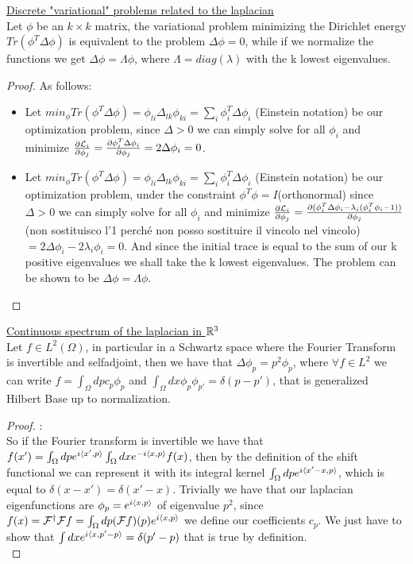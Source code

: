 \documentclass[../main.tex]{subfiles}
\begin{document}
\begin{prop}
    \underline{Discrete "variational" problems related to the laplacian}\\
    Let $\phi$ be an $k \times k$ matrix, the variational problem minimizing the Dirichlet energy $Tr(\phi^T \Delta \phi)$ is equivalent to
    the problem $\Delta \phi = 0$, while if we normalize the functions we get $\Delta \phi = \Lambda \phi$, where $\Lambda = diag(\lambda)$ with 
    the k lowest eigenvalues.
\end{prop}
\begin{proof} As follows:\\
    \begin{itemize}
        \item
	Let $min_{\phi}Tr(\phi^T \Delta \phi) = \phi_{li}\Delta_{lk}\phi_{ki} = \sum_i \phi_i^T \Delta \phi_i $ (Einstein notation) be our optimization problem,
	since $\Delta > 0$ we can simply solve for all $\phi_i$ and minimize $\frac{\partial \mathcal{L}_i}{\partial \phi_j} = \frac{\partial \phi_i^T \Delta \phi_i}{\partial \phi_j}
	 = 2\Delta\phi_i=0$.
	 \item
	Let $min_{\phi}Tr(\phi^T \Delta \phi) = \phi_{li}\Delta_{lk}\phi_{ki} = \sum_i \phi_i^T \Delta \phi_i $ (Einstein notation) be our optimization problem,
        under the constraint $\phi^T \phi = I$(orthonormal) since $\Delta > 0$ we can simply solve for all $\phi_i$ and minimize 
	$\frac{\partial \mathcal{L}_i}{\partial \phi_j} = \frac{\partial (\phi_i^T \Delta \phi_i -\lambda_i(\phi_i^T\phi_i -1))}{\partial \phi_j}$(non sostituisco l'1 perché non posso sostituire il vincolo 
	nel vincolo)$ = 2\Delta\phi_i-2\lambda_i\phi_i=0$. And since the initial trace is equal to the sum of our k positive eigenvalues we shall take the
	k lowest eigenvalues. The problem can be shown to be $\Delta \phi = \Lambda \phi$.
   \end{itemize}
\end{proof}

\begin{prop}
    \underline{Continuous spectrum of the laplacian in $\mathbb{R}^3$}\\
    Let $f \in L^2(\Omega)$, in particular in a Schwartz space where the Fourier Transform is invertible and selfadjoint,
    then we have that $\Delta \phi_p = p^2 \phi_p$, where $\forall f \in L^2$ we can write $f = \int_\Omega dp c_p \phi_p$
    and $\int_\Omega dx \phi_p \phi_{p'} = \delta(p-p')$, that is generalized Hilbert Base up to normalization.
\end{prop}
\begin{proof}:\\
    So if the Fourier transform is invertible we have that $f(x') = \int_\Omega dp e^{i\langle x', p \rangle}\int_\Omega dx e^{-i\langle x, p \rangle}f(x)$, 
    then by the definition of the shift functional we can represent it with its integral kernel $\int_\Omega dp e^{i\langle x'-x, p \rangle}$, which
    is equal to $\delta(x-x') = \delta(x'-x)$. Trivially we have that our laplacian eigenfunctions are $\phi_p = e^{i\langle x, p \rangle}$ of eigenvalue $p^2$, since 
    $f(x) = \mathcal{F}^\dag \mathcal{F}f = \int_\Omega dp (\mathcal{F}f)(p)e^{i\langle x, p \rangle}$ we define our coefficients $c_p$. We just have to show that
    $\int dx e^{i\langle x, p'-p \rangle} = \delta(p'-p)$ that is true by definition.\\
\end{proof}
    

\end{document}
